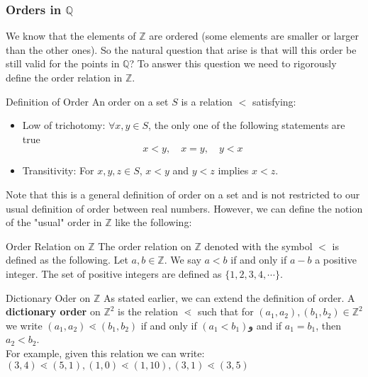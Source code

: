\subsubsection{Orders in $ \mathbb{Q} $}
We know that the elements of $ \mathbb{Z} $ are ordered (some elements are smaller or larger than the other ones). So the natural question that arise is that will this order be still valid for the points in $ \mathbb{Q} $? To answer this question we need to rigorously define the order relation in $ \mathbb{Z} $.

\begin{defbox}{Definition of Order}
	An order on a set $ S $ is a relation $ < $ satisfying:
	\begin{itemize}
		\item Low of trichotomy: $ \forall x,y \in S $, the only one of the following statements are true
		\[ x<y, \quad x=y, \quad y<x \]
		
		\item Transitivity: For $ x,y,z \in S $, $ x<y $ and $ y<z $ implies $ x<z $.
	\end{itemize}
\end{defbox}


Note that this is a general definition of order on a set and is not restricted to our usual definition of order between real numbers. However, we can define the notion of the "usual" order in $ \mathbb{Z} $ like the following:

\begin{defbox}{Order Relation on $ \mathbb{Z} $}
	The order relation on $ \mathbb{Z} $ denoted with the symbol $ < $ is defined as the following. Let $ a,b \in \mathbb{Z} $. We say $ a<b $ if and only if $ a-b $ a positive integer. The set of positive integers are defined as $ \{ 1,2,3,4,\cdots \} $.
\end{defbox}

\begin{example}{Dictionary Oder on $\mathbb{Z}$}
	As stated earlier, we can extend the definition of order. A \textbf{dictionary order} on $\mathbb{Z}^2$ is the relation $\lessdot$ such that for $(a_1, a_2), (b_1,b_2) \in \mathbb{Z}^2$ we write $(a_1, a_2) \lessdot (b_1, b_2)$ if and only if  $(a_1 < b_1) $و and if $a_1 = b_1$, then $ a_2 < b_2 $. \\
	For example, given this relation we can write:
	$(3,4) \lessdot (5,1), (1,0) \lessdot (1,10), (3,1) \lessdot (3,5)$
\end{example}



